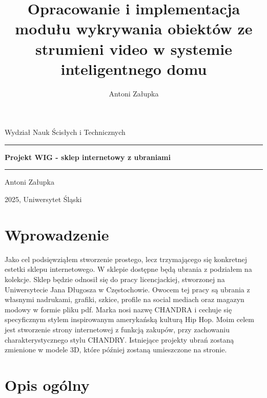 \documentclass[14pt]{extarticle}
\title{Opracowanie i implementacja modułu wykrywania obiektów ze strumieni video w systemie inteligentnego domu}
\author{Antoni Załupka}
\begin{document}
	\thispagestyle{empty}
	
	\begin{center}
		\Large{Wydział Nauk Ścisłych i Technicznych}
	\end{center}
	
	\vspace{2cm}
	
	\rule{\linewidth}{2mm} 
	
	\begin{center}
		\huge \textbf{Projekt WIG - sklep internetowy z ubraniami} \\
	\end{center}
	
	\rule{\linewidth}{0.5mm} 
	
	\vspace{2cm}
	
	\begin{center}
		\Large{Antoni Załupka}
	\end{center}
	
	\vspace{1.5cm}
	
	
	
	\vspace{8cm}
	
	\begin{center}
		\Large{2025, Uniwersytet Śląski}
	\end{center}
	
	\newpage
	
	\section{Wprowadzenie}
		Jako cel podsięwziąłem stworzenie prostego, lecz trzymającego się konkretnej estetki sklepu internetowego. W sklepie dostępne będą ubrania z podziałem na kolekcje. Sklep będzie odnosił się do pracy licencjackiej, stworzonej na Uniwersytecie Jana Długosza w Częstochowie. Owocem tej pracy są ubrania z własnymi nadrukami, grafiki, szkice, profile na social mediach oraz magazyn modowy w formie pliku pdf. Marka nosi nazwę CHANDRA i cechuje się specyficznym stylem inspirowanym amerykańską kulturą Hip Hop. Moim celem jest stworzenie strony internetowej z funkcją zakupów, przy zachowaniu charakterystycznego stylu CHANDRY. Istniejące projekty ubrań zostaną zmienione w modele 3D, które później zostaną umieszczone na stronie.
		
	\section{Opis ogólny}
\end{document}
